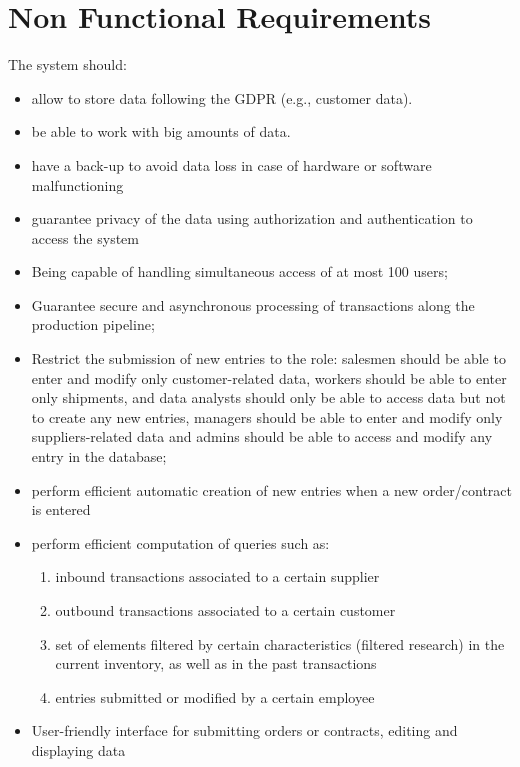 \section{Non Functional Requirements}
The system should:
\begin{itemize}
    \item allow to store data following the GDPR (e.g., customer data).
    \item be able to work with big amounts of data.
    \item have a back-up to avoid data loss in case of hardware or software malfunctioning
    \item guarantee privacy of the data using authorization and authentication to access the system
    \item Being capable of handling simultaneous access of at most 100 users;
    \item Guarantee secure and asynchronous processing of transactions along the production pipeline;
    \item Restrict the submission of new entries to the role: salesmen should be able to enter and modify only customer-related data, workers should be able to enter only shipments, and data analysts should only be able to access data but not to create any new entries, managers should be able to enter and modify only suppliers-related data and admins should be able to access and modify any entry in the database;
    \item perform efficient automatic creation of new entries when a new order/contract is entered 
    \item perform efficient computation of queries such as:
    \begin{enumerate}
	    \item inbound transactions associated to a certain supplier
	    \item outbound transactions associated to a certain customer
	    \item set of elements filtered by certain characteristics (filtered research) in the current inventory, as well as in the past transactions
   		\item entries submitted or modified by a certain employee
    \end{enumerate}
    \item User-friendly interface for submitting orders or contracts, editing and displaying data
\end{itemize}

